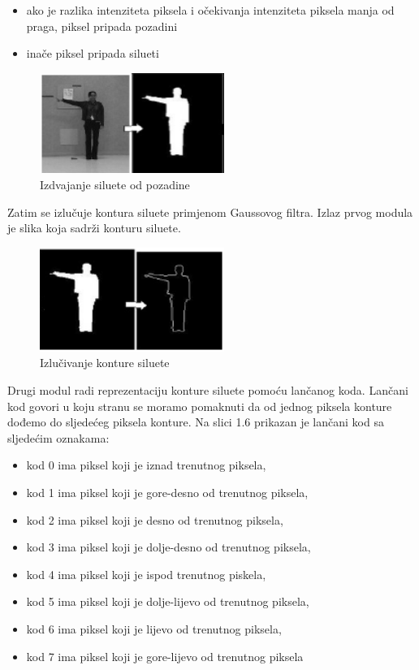 \documentclass[times, utf8, diplomski]{fer}
\begin{document}
\begin{itemize}
\item ako je razlika intenziteta piksela i očekivanja intenziteta piksela manja od praga, piksel
pripada pozadini
\item inače piksel pripada silueti
\end{itemize}

\begin{figure}[ht!]
\centering
\includegraphics[width=60mm]{pozadina1.png}
\caption{ Izdvajanje siluete od pozadine \label{overflow}}
\label{img:bgfb}
\end{figure}

Zatim se izlučuje kontura siluete primjenom Gaussovog filtra. Izlaz prvog modula je slika
koja sadrži konturu siluete.

\begin{figure}[ht!]
\centering
\includegraphics[width=60mm]{pozadina2.png}
\caption{ Izlučivanje konture siluete \label{overflow}}
\label{img:contourextr}
\end{figure}

Drugi modul radi reprezentaciju konture siluete pomoću lančanog koda. Lančani kod govori
u koju stranu se moramo pomaknuti da od jednog piksela konture dođemo do sljedećeg
piksela konture. Na slici 1.6 prikazan je lančani kod sa sljedećim oznakama:

\begin{itemize}
\item kod 0 ima piksel koji je iznad trenutnog piksela,
\item kod 1 ima piksel koji je gore-desno od trenutnog piksela,
\item kod 2 ima piksel koji je desno od trenutnog piksela,
\item kod 3 ima piksel koji je dolje-desno od trenutnog piksela,
\item kod 4 ima piksel koji je ispod trenutnog piskela,
\item kod 5 ima piksel koji je dolje-lijevo od trenutnog piksela,
\item kod 6 ima piksel koji je lijevo od trenutnog piksela,
\item kod 7 ima piksel koji je gore-lijevo od trenutnog piksela
\end{itemize}
\end{document}
